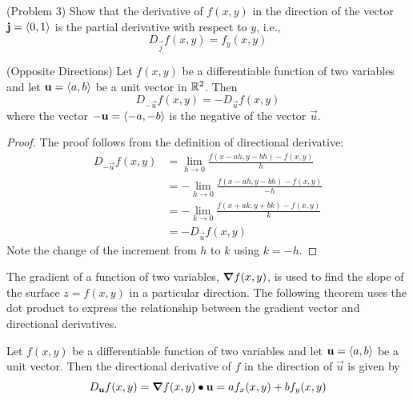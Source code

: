 \documentclass[handout]{ximera}
\begin{document}
\begin{problem}(Problem 3)
Show that the derivative of $f(x,y)$ in the direction of 
the vector $\mathbf j = \left\langle 0,1\right\rangle$ is the partial derivative with respect 
to $y$, i.e.,
\[D_{\vec j} f(x,y) = f_y(x,y)\]
\end{problem}


\begin{proposition}(Opposite Directions)
Let $f(x,y)$ be a differentiable function of two variables and let $\mathbf u = \left\langle a,b\right\rangle$ 
be a unit vector in $\mathbb R^2$. Then
\[
D_{-\vec u} f(x,y) = -D_{\vec u} f(x,y)
\]
where the vector $-\mathbf u = \left\langle -a, -b\right\rangle$ is the negative of the vector $\vec u$.
\end{proposition}

\begin{proof}
The proof follows from the definition of directional derivative:
\begin{align*}
D_{-\vec u} f(x,y) &= \lim_{h \to 0} \frac{f(x - ah, y - bh) -f(x,y)}{h} \\[6pt]
                   &= -\lim_{h \to 0} \frac{f(x - ah, y - bh) -f(x,y)}{-h} \\[6pt]
                   &= -\lim_{k \to 0} \frac{f(x + ak, y  + bk) -f(x,y)}{k} \\[6pt]
                   &= -D_{\vec u} f(x,y)
\end{align*}
Note the change of the increment from $h$ to $k$ using $k = -h$.
\end{proof}

The gradient of a function of two variables, $\boldsymbol\nabla f(x,y)$, is used to find 
the slope of the surface $z = f(x,y)$ in a particular direction.
The following theorem uses the dot product to express the relationship between 
the gradient vector and directional derivatives.

\begin{theorem}
Let $f(x,y)$ be a differentiable function of two variables 
and let $\mathbf u = \left\langle a,b\right\rangle$ be a unit vector.
Then the directional derivative of $f$ in the direction of $\vec u$ is given by
\[
D_{\mathbf u} f(x,y) = \boldsymbol\nabla f(x,y) \bullet \mathbf u = af_x(x,y) + bf_y(x,y)
\]
\end{theorem}
\end{document}
